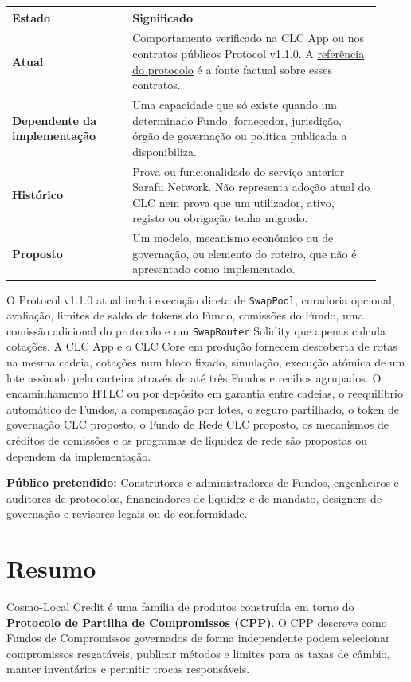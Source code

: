 \documentclass[11pt]{article}
\begin{document}
\begin{longtable}{P{0.30\linewidth} P{0.62\linewidth}}
\toprule
Estado & Significado \\
\midrule
\endhead
\textbf{Atual} & Comportamento verificado na CLC App ou nos contratos públicos Protocol v1.1.0. A \href{https://docs.cosmolocal.credit/pt/protocol/overview}{referência do protocolo} é a fonte factual sobre esses contratos. \\
\textbf{Dependente da implementação} & Uma capacidade que só existe quando um determinado Fundo, fornecedor, jurisdição, órgão de governação ou política publicada a disponibiliza. \\
\textbf{Histórico} & Prova ou funcionalidade do serviço anterior Sarafu Network. Não representa adoção atual do CLC nem prova que um utilizador, ativo, registo ou obrigação tenha migrado. \\
\textbf{Proposto} & Um modelo, mecanismo económico ou de governação, ou elemento do roteiro, que não é apresentado como implementado. \\
\bottomrule
\end{longtable}

O Protocol v1.1.0 atual inclui execução direta de \texttt{SwapPool}, curadoria opcional, avaliação, limites de saldo de tokens do Fundo, comissões do Fundo, uma comissão adicional do protocolo e um \texttt{SwapRouter} Solidity que apenas calcula cotações. A CLC App e o CLC Core em produção fornecem descoberta de rotas na mesma cadeia, cotações num bloco fixado, simulação, execução atómica de um lote assinado pela carteira através de até três Fundos e recibos agrupados. O encaminhamento HTLC ou por depósito em garantia entre cadeias, o reequilíbrio automático de Fundos, a compensação por lotes, o seguro partilhado, o token de governação CLC proposto, o Fundo de Rede CLC proposto, os mecanismos de créditos de comissões e os programas de liquidez de rede são propostas ou dependem da implementação.

\textbf{Público pretendido:} Construtores e administradores de Fundos, engenheiros e auditores de protocolos, financiadores de liquidez e de mandato, designers de governação e revisores legais ou de conformidade.

\section*{Resumo}

Cosmo-Local Credit é uma família de produtos construída em torno do \textbf{Protocolo de Partilha de Compromissos (CPP)}. O CPP descreve como Fundos de Compromissos governados de forma independente podem selecionar compromissos resgatáveis, publicar métodos e limites para as taxas de câmbio, manter inventários e permitir trocas responsáveis.
\end{document}
